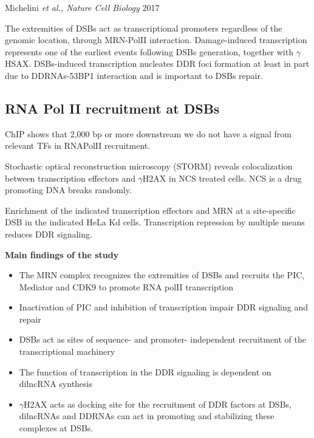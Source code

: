 Michelini \emph{et al., Nature Cell Biology} 2017

The extremities of DSBs act as transcriptional promoters regardless of the genomic location, through MRN-PolII interaction. Damage-induced transcription represents one of the earliest events following DSBs generation, together with \(\gamma\)HSAX. DSBs-induced transcription nucleates DDR foci formation at least in part due to DDRNAs-53BP1 interaction and is important to DSBs repair.

\hypertarget{rna-pol-ii-recruitment-at-dsbs}{%
\subsection{RNA Pol II recruitment at DSBs}\label{rna-pol-ii-recruitment-at-dsbs}}

ChIP shows that 2,000 bp or more downstream we do not have a signal from relevant TFs in RNAPolII recruitment.

Stochastic optical reconstruction microscopy (STORM) reveals colocalization between transcription effectors and \(\gamma\)H2AX in NCS treated cells. NCS is a drug promoting DNA breaks randomly.

Enrichment of the indicated transcription effectors and MRN at a site-specific DSB in the indicated HeLa Kd cells. Transcription repression by multiple means reduces DDR signaling.

\textbf{Main findings of the study}

\begin{itemize}
\tightlist
\item
  The MRN complex recognizes the extremities of DSBs and recruits the PIC, Mediator and CDK9 to promote RNA polII transcription
\item
  Inactivation of PIC and inhibition of transcription impair DDR signaling and repair
\item
  DSBs act as sites of sequence- and promoter- independent recruitment of the transcriptional machinery
\item
  The function of transcription in the DDR signaling is dependent on dilncRNA synthesis
\item
  \(\gamma\)H2AX acts as docking site for the recruitment of DDR factors at DSBs, dilncRNAs and DDRNAs can act in promoting and stabilizing these complexes at DSBs.
\end{itemize}
